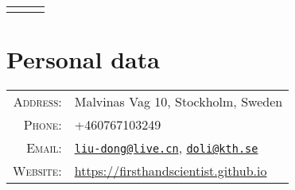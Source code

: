 \documentclass[a4paper,10pt]{article}
\begin{document}
\pagestyle{empty}


\begin{center}
  \begin{tabular}{lcr}
    \par{\centering{\Huge Dong Liu, Ph.D.}\bigskip\par} & & %
  \end{tabular}
\end{center}

\section{Personal data}

\begin{tabular}{rl}
  \textsc{Address:} & Malvinas Vag 10, Stockholm, Sweden \\
  \textsc{Phone:} & +460767103249 \\
  \textsc{Email:} & \href{mailto:liu-dong@live.cn}{\nolinkurl{liu-dong@live.cn}}, \href{mailto:doli@kth.se}{\nolinkurl{doli@kth.se}} \\
  \textsc{Website:} & \href{https://firsthandscientist.github.io}{https://firsthandscientist.github.io}\\
\end{tabular}

\end{document}
